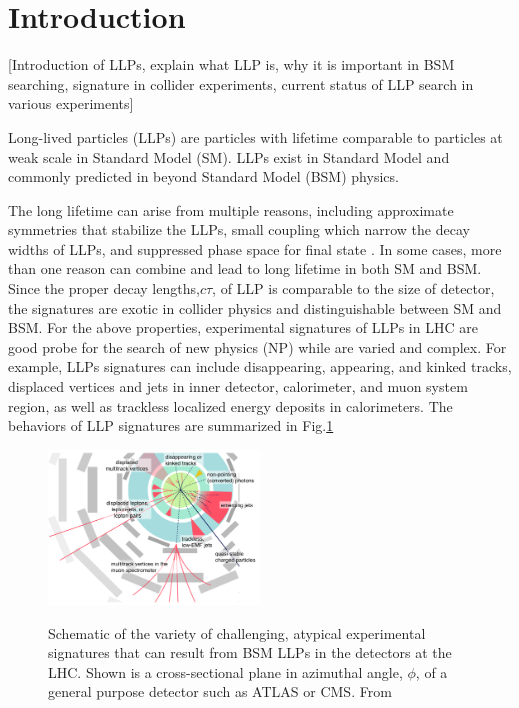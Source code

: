 \section{Introduction}
[Introduction of LLPs, explain what LLP is, why it is important in BSM searching, signature in collider experiments, current status of LLP search in various experiments]

Long-lived particles (LLPs) are particles with lifetime comparable to particles at weak scale in Standard Model (SM). LLPs exist in Standard Model and commonly predicted in beyond Standard Model (BSM) physics. 

The long lifetime can arise from multiple reasons, including approximate symmetries that stabilize the LLPs, small coupling which narrow the decay widths of LLPs, and suppressed phase space for final state \cite{alimena2019searching}. In some cases, more than one reason can combine and lead to long lifetime in both SM and BSM. Since the proper decay lengths,$c\tau$, of LLP is comparable to the size of detector, the signatures are exotic in collider physics and distinguishable between SM and BSM. For the above properties, experimental signatures of LLPs in LHC are good probe for the search of new physics (NP) while are varied and complex. For example, LLPs signatures can include disappearing, appearing, and kinked tracks, displaced vertices and jets in inner detector, calorimeter, and muon system region, as well as trackless localized energy deposits in calorimeters. The behaviors of LLP signatures are summarized in Fig.\ref{fig:LLPsignature}

\begin{figure}[!h]
    \centering
    \caption{Schematic of the variety of challenging, atypical experimental signatures that can result from BSM LLPs in the detectors at the LHC. Shown is a cross-sectional plane in azimuthal angle, $\phi$, of a general purpose detector such as ATLAS or CMS. From \cite{russell2017llp}}
    \includegraphics[width=0.5\textwidth]{fig/LLPSignature.png}
    \label{fig:LLPsignature}
\end{figure}

